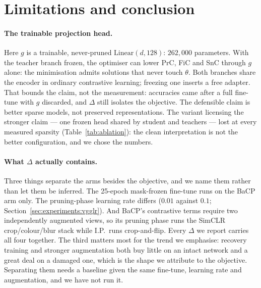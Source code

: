 \section{Limitations and conclusion}
\label{sec:limitations}
\label{sec:discussion}

\paragraph{The trainable projection head.}
Here $g$ is a trainable, never-pruned $\mathrm{Linear}(d,128)$:
$262{,}000$ parameters. With the teacher branch frozen, the optimiser can lower
PrC, FiC and SnC through $g$ alone: the minimisation admits solutions that never
touch $\theta$. Both branches share the encoder in ordinary contrastive
learning; freezing one inserts a free adapter. That bounds the claim, not the
measurement: accuracies came after a full fine-tune with $g$ discarded, and
$\Delta$ still isolates the objective. The defensible claim is better sparse
models, not preserved representations. The variant licensing the stronger claim --- one frozen head shared by student
and teachers --- lost at every measured sparsity (Table~\ref{tab:ablation}): the
clean interpretation is not the better configuration, and we chose the numbers.

\paragraph{What $\Delta$ actually contains.}
Three things separate the arms besides the objective, and we name them rather
than let them be inferred. The 25-epoch mask-frozen fine-tune runs on the BaCP
arm only. The pruning-phase learning rate differs ($0.01$ against $0.1$;
Section~\ref{sec:experiments:vgglr}). And BaCP's contrastive terms require two
independently augmented views, so its pruning phase runs the SimCLR
crop/colour/blur stack while I.P.\ runs crop-and-flip. Every $\Delta$ we report
carries all four together. The third matters most for the trend we emphasise:
recovery training and stronger augmentation both buy little on an intact
network and a great deal on a damaged one, which is the shape we attribute to
the objective. Separating them needs a baseline given the same fine-tune,
learning rate and augmentation, and we have not run it.

